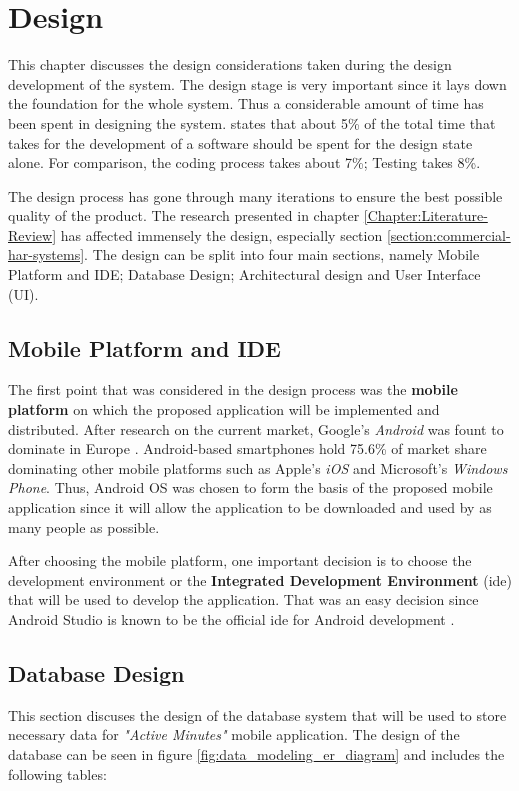 \chapter{Design}
\label{Chapter:Design}

This chapter discusses the design considerations taken during the design development of the system. The design stage is very important since it lays down the foundation for the whole system.
Thus a considerable amount of time has been spent in designing the system. \citet[12]{bell2005} states that about 5\% of the total time that takes for the development of a software should be spent for the design state alone. For comparison, the coding process takes about 7\%; Testing takes 8\%. 

The design process has gone through many iterations to ensure the best possible quality of the product. The research presented in chapter \ref{Chapter:Literature-Review} has affected immensely the design, especially section \ref{section:commercial-har-systems}. The design can be split into four main sections, namely Mobile Platform and IDE; Database Design; Architectural design and User Interface (UI).

    \section{Mobile Platform and IDE}
        The first point that was considered in the design process was the \textbf{mobile platform} on which the proposed application will be implemented and distributed. After research on the current market, Google's \textit{Android} was fount to dominate in Europe \citep{williams2016}. Android-based smartphones hold 75.6\% of market share dominating other mobile platforms such as Apple's \textit{iOS} and Microsoft's \textit{Windows Phone}. Thus, Android OS was chosen to form the basis of the proposed mobile application since it will allow the application to be downloaded and used by as many people as possible.
        
        After choosing the mobile platform, one important decision is to choose the development environment or the \textbf{Integrated Development Environment} (\gls{ide}) that will be used to develop the application. That was an easy decision since Android Studio is known to be the official \gls{ide} for Android development \citep{androidstudio2017}.

    \section{Database Design}
    This section discuses the design of the database system that will be used to store necessary data for \textit{"Active Minutes"} mobile application. The design of the database can be seen in figure \ref{fig:data_modeling_er_diagram} and includes the following tables:
        
